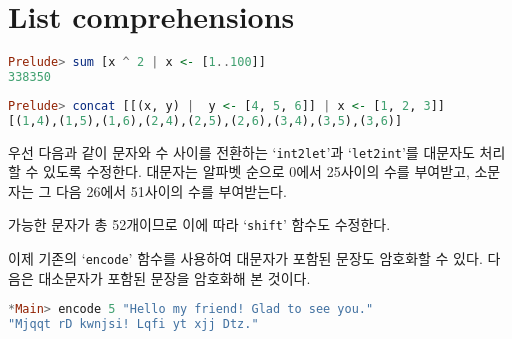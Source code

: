 \chapter{\Large{List comprehensions}}

\begin{lstlisting}[language=Haskell]
Prelude> sum [x ^ 2 | x <- [1..100]]
338350
\end{lstlisting}




\begin{lstlisting}[language=Haskell]
Prelude> concat [[(x, y) |  y <- [4, 5, 6]] | x <- [1, 2, 3]]
[(1,4),(1,5),(1,6),(2,4),(2,5),(2,6),(3,4),(3,5),(3,6)]
\end{lstlisting}




우선 다음과 같이 문자와 수 사이를 전환하는 `\texttt{int2let}'과
`\texttt{let2int}'를 대문자도 처리할 수 있도록 수정한다. 대문자는 알파벳
순으로 0에서 25사이의 수를 부여받고, 소문자는 그 다음 26에서 51사이의 수를
부여받는다.

가능한 문자가 총 52개이므로 이에 따라 `\texttt{shift}' 함수도 수정한다.

이제 기존의 `\texttt{encode}' 함수를 사용하여 대문자가 포함된 문장도 암호화할
수 있다. 다음은 대소문자가 포함된 문장을 암호화해 본 것이다.
\begin{lstlisting}[language=Haskell]
*Main> encode 5 "Hello my friend! Glad to see you."
"Mjqqt rD kwnjsi! Lqfi yt xjj Dtz."
\end{lstlisting}


